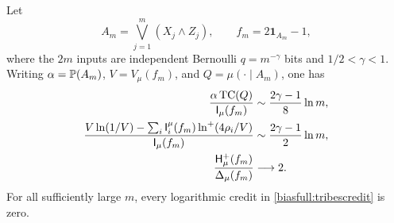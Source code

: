 \begin{proposition}\label{biasfull:tribes}
Let
\[
 A_m=\bigvee_{j=1}^m(X_j\wedge Z_j),\qquad f_m=2\mathbf1_{A_m}-1,
\]
where the \(2m\) inputs are independent Bernoulli \(q=m^{-\gamma}\)
bits and \(1/2<\gamma<1\).
Writing \(\alpha=\P(A_m)\), \(V=V_\mu(f_m)\), and \(Q=\mu(\cdot\mid A_m)\),
one has
\begin{align}
 \frac{\alpha\TC(Q)}{\I_\mu(f_m)}
     &\sim\frac{2\gamma-1}{8}\ln m,\label{biasfull:tribestc}\\
 \frac{V\ln(1/V)-\sum_i\I_i^\mu(f_m)\ln^+(4\rho_i/V)}
           {\I_\mu(f_m)}
     &\sim\frac{2\gamma-1}{2}\ln m,\label{biasfull:tribescredit}\\
 \frac{\HH_\mu^+(f_m)}{\Delta_\mu(f_m)}
     &\longrightarrow2.\label{biasfull:tribesratio}
\end{align}
For all sufficiently large \(m\), every logarithmic credit in
\eqref{biasfull:tribescredit} is zero.
\end{proposition}
